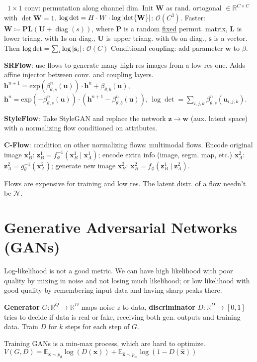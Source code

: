 \documentclass[11pt,landscape,a4paper,fleqn]{article}
\newcommand{\E}{\mathbb{E}}
\DeclareMathOperator{\diag}{\mathrm{diag}}
\newcommand{\R}{\mathbb{R}}
\renewcommand{\exp}{\mathrm{exp}}
\def\myvector#1{\mathbf{#1}}
\def\vh{{\myvector{h}}}
\def\vs{{\myvector{s}}}
\def\vu{{\myvector{u}}}
\def\vw{{\myvector{w}}}
\def\vx{{\myvector{x}}}
\def\vz{{\myvector{z}}}
\def\mymatrix#1{\mathbf{#1}}
\def\mL{{\mymatrix{L}}}
\def\mP{{\mymatrix{P}}}
\def\mU{{\mymatrix{U}}}
\def\mW{{\mymatrix{W}}}
\begin{document}
\begin{multicols*}{4}
\textbullet\ $1 \times 1$ conv: permutation along channel dim.
    Init $\mW$ as rand. ortogonal $\in \R^{C \times C}$ with $\det\mW = 1$.
    $\log\det = H \cdot W \cdot \log\abs{\det\mW}$: $\mathcal{O}(C^3)$.
    Faster: $\mW \coloneqq \mP \mL(\mU + \diag(s))$,
    where $\mP$ is a random \underline{fixed} permut. matrix,
    $\mL$ is lower triang. with 1s on diag.,
    $\mU$ is upper triang. with 0s on diag.,
    $\vs$ is a vector.
    Then $\log\det = \sum_i \log \abs{\vs_i}$: $\mathcal{O}(C)$
Conditional coupling: add parameter $\vw$ to $\beta$.

\textbf{SRFlow}: use flows to generate many high-res images from a low-res one.
Adds affine injector between conv. and coupling layers.
$\vh^{n+1} = \exp(\beta^n_{\theta, s}(\vu)) \cdot \vh^n + \beta_{\theta, b}(\vu)$,
$\vh^n = \exp( - \beta^n_{\theta, s}(\vu)) \cdot (\vh^{n+1} - \beta^n_{\theta, b}(\vu))$,
$\log\det = \sum_{i,j,k} \beta^n_{\theta, s}(\vu_{i, j, k})$.

\textbf{StyleFlow}: Take StyleGAN and replace the network $\vz \to \vw$ (aux. latent space)
with a normalizing flow conditioned on attributes.

\textbf{C-Flow}: condition on other normalizing flows: multimodal flows.
Encode original image $\vx_B^1$: $\vz_B^1 = f^{-1}_\phi(\vx_B^1 \mid \vx_A^1)$;
encode extra info (image, segm. map, etc.) $\vx_A^2$: $\vz_A^2 = g^{-1}_\theta(\vx_A^2)$;
generate new image $\vx_B^2$: $\vx_B^2 = f_\phi(\vz_B^1 \mid \vz_A^2)$.

Flows are expensive for training and low res.
The latent distr. of a flow needn't be $\mathcal{N}$.

\section{Generative Adversarial Networks (GANs)}

Log-likelihood is not a good metric. We can have high likelihood with poor quality by mixing in noise and not losing much likelihood; or low likelihood with good quality by remembering input data and having sharp peaks there.

\textbf{Generator} $G : \R^Q \to \R^D$ maps noise $z$ to data,
\textbf{discriminator} $D : \R^D \to [0, 1]$ tries to decide if data is real or fake,
receiving both gen. outputs and training data.
Train $D$ for $k$ steps for each step of $G$.

Training GANs is a min-max process, which are hard to optimize.
$V(G, D) = \E_{\vx \sim p_{\mathrm{d}}} \log(D(\vx)) + \E_{\hat{\vx} \sim p_{\mathrm{m}}} \log(1 - D(\hat{\vx}))$


\end{multicols*}
\end{document}
